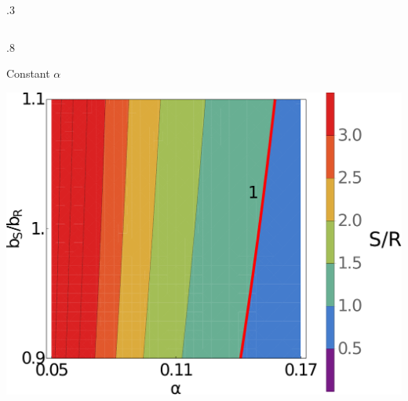 \documentclass[final]{beamer}
\newlength{\sepwid}
\newlength{\onecolwid}
\newlength{\figwid}
\begin{document}
\begin{frame}[t]
\begin{block}
\begin{columns}[t]
\begin{column}{.3\onecolwid}\end{column} %
\end{columns} %
\end{block}




\begin{block}

\begin{columns}[t]

\begin{column}{.8\onecolwid}

  \begin{block}{Constant $\alpha$}
  \begin{center}
    \includegraphics[width=\figwid]{../dev/graphics/poster/const_contour.pdf}
    \vspace{1.5ex}


\end{center}
\end{block}
\end{column}
\end{columns}
\end{block}
\end{frame}
\end{document}
